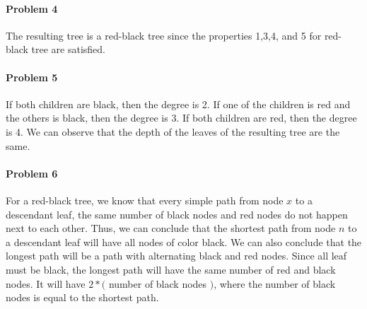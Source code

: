 \documentclass[11pt]{article}
\begin{document}
\paragraph{\noindent\textbf{\LARGE{Problem 4}}}

\begin{flushleft}
    The resulting tree is a red-black tree since the properties 1,3,4, and 5 for red-black tree are satisfied. 
\end{flushleft}

\paragraph{\noindent\textbf{\LARGE{Problem 5}}}

\begin{flushleft}
If both children are black, then the degree is 2. If one of the children is red and the others is black, then the degree is 3. If both children are red, then the degree is 4.
We can observe that the depth of the leaves of the resulting tree are the same.
\end{flushleft}    

\paragraph{\noindent\textbf{\LARGE{Problem 6}}}
\begin{flushleft}
    For a red-black tree, we know that every simple path from node $x$ to a descendant leaf, the same number of black nodes and
red nodes do not happen next to each other.
    \newline
    \newline
    Thus, we can conclude that the shortest path from node $n$ to a descendant leaf will have all nodes of color black.
    We can also conclude that the longest path will be a path with alternating black and red nodes.
    \newline
    \newline
    Since all leaf must be black, the longest path will have the same number of red and black nodes. It will have $2* ($ number of black nodes $)$, where the number of black nodes is equal
    to the shortest path. 
\end{flushleft}    
    
\end{document}

